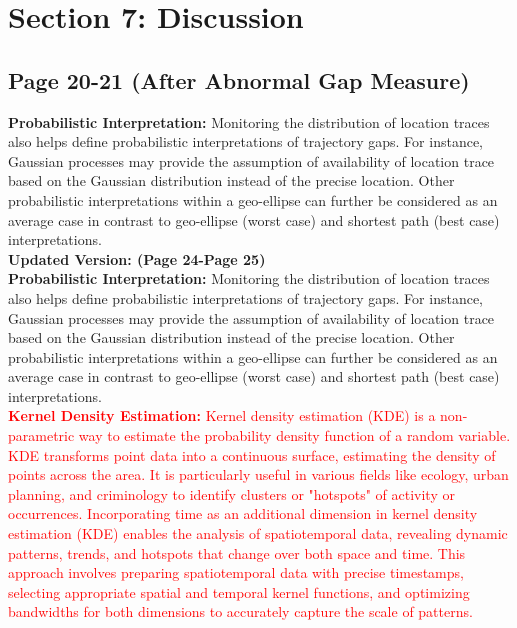 \documentclass[twoside,leqno,onecolumn]{article}
\begin{document}
\section{Section 7: Discussion}
\subsection{Page 20-21 (After Abnormal Gap Measure)}
\textbf{Probabilistic Interpretation:} Monitoring the distribution of location traces also helps define probabilistic interpretations of trajectory gaps. For instance, Gaussian processes may provide the assumption of availability of location trace based on the Gaussian distribution instead of the precise location. Other probabilistic interpretations within a geo-ellipse can further be considered as an average case in contrast to geo-ellipse (worst case) and shortest path (best case) interpretations. \\

\textbf{Updated Version: (Page 24-Page 25)\\ }
\textbf{Probabilistic Interpretation:} Monitoring the distribution of location traces also helps define probabilistic interpretations of trajectory gaps. For instance, Gaussian processes may provide the assumption of availability of location trace based on the Gaussian distribution instead of the precise location. Other probabilistic interpretations within a geo-ellipse can further be considered as an average case in contrast to geo-ellipse (worst case) and shortest path (best case) interpretations. \\

\textcolor{red}{\textbf{Kernel Density Estimation:} Kernel density estimation (KDE) is a non-parametric way to estimate the probability density function of a random variable. KDE transforms point data into a continuous surface, estimating the density of points across the area. It is particularly useful in various fields like ecology, urban planning, and criminology to identify clusters or "hotspots" of activity or occurrences. Incorporating time as an additional dimension in kernel density estimation (KDE) enables the analysis of spatiotemporal data, revealing dynamic patterns, trends, and hotspots that change over both space and time. This approach involves preparing spatiotemporal data with precise timestamps, selecting appropriate spatial and temporal kernel functions, and optimizing bandwidths for both dimensions to accurately capture the scale of patterns.}\\
\end{document}
